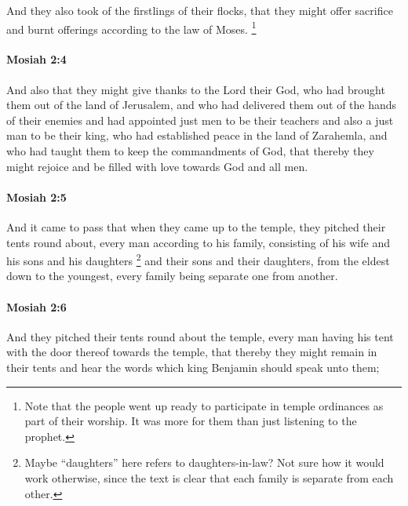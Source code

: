 			And they also took of the firstlings of their flocks,
			that they might offer sacrifice and burnt offerings according to the law of Moses.%
				\footnote{%
					\label{MOSIAH-2-3-NOTE-offerings}
					Note that the people went up ready to participate in temple ordinances as part of their worship. It was more for them than just listening to the prophet.
					}%
			
		\paragraph{Mosiah 2:4} %
			\label{MOSIAH-2-4}
			
			And also that they might give thanks to the Lord their God,
			who had brought them out of the land of Jerusalem,
			and who had delivered them out of the hands of their enemies
			and had appointed just men to be their teachers
			and also a just man to be their king,
			who had established peace in the land of Zarahemla,
			and who had taught them to keep the commandments of God,
			that thereby they might rejoice and be filled with love towards God and all men.
			
		\paragraph{Mosiah 2:5} %
			\label{MOSIAH-2-5}
			
			And it came to pass that when they came up to the temple,
			they pitched their tents round about,
			every man according to his family,
			consisting of his wife and his sons and his daughters%
				\footnote{%
					\label{MOSIAH-2-5-NOTE-daughters}%
					Maybe ``daughters'' here refers to daughters-in-law? Not sure how it would work otherwise, since the text is clear that each family is separate from each other.
					}
			and their sons and their daughters,
			from the eldest down to the youngest,
			every family being separate one from another.
			
		\paragraph{Mosiah 2:6} %
			\label{MOSIAH-2-6}
			
			And they pitched their tents round about the temple,
			every man having his tent with the door thereof towards the temple,
			that thereby they might remain in their tents
			and hear the words which king Benjamin should speak unto them;
			

